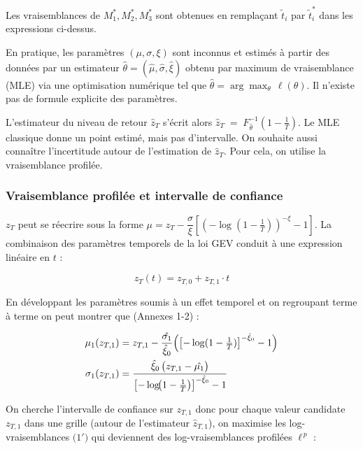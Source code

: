 \documentclass[
  article,
  nofooter,
  noheadings]{jss}
\begin{document}
Les vraisemblances de \(M_1^*, M_2^*, M_3^*\) sont obtenues en
remplaçant \(\tilde{t}_i\) par \(\tilde{t}_i^\ast\) dans les expressions
ci-dessus.

En pratique, les paramètres \((\mu, \sigma, \xi)\) sont inconnus et
estimés à partir des données par un estimateur
\(\hat{\theta} = (\hat{\mu}, \hat{\sigma}, \hat{\xi})\) obtenu par
maximum de vraisemblance (MLE) via une optimisation numérique tel que
\(\hat{\theta} = \arg\max_{\theta} \, \ell(\theta)\). Il n'existe pas de
formule explicite des paramètres.

L'estimateur du niveau de retour \(\hat{z}_T\) s'écrit alors
\(\hat{z}_{T}\;=\;F^{-1}_{\hat{\theta}}\!\left(1-\frac{1}{T}\right)\).
Le MLE classique donne un point estimé, mais pas d'intervalle. On
souhaite aussi connaître l'incertitude autour de l'estimation de
\(\hat{z}_T\). Pour cela, on utilise la vraisemblance profilée.

\subsubsection{Vraisemblance profilée et intervalle de
confiance}\label{vraisemblance-profiluxe9e-et-intervalle-de-confiance}

\(z_T\) peut se réecrire sous la forme
\(\mu = z_T - \dfrac{\sigma}{\xi} \left[ \left( -\log\left(1 - \frac{1}{T} \right) \right)^{-\xi} - 1 \right]\).
La combinaison des paramètres temporels de la loi GEV conduit à une
expression linéaire en \(t\) :

\[
z_T(t) = z_{T,0} + z_{T,1} \cdot t
\]

En développant les paramètres soumis à un effet temporel et on
regroupant terme à terme on peut montrer que (Annexes 1-2) :

\[
\begin{aligned}
\mu_1(z_{T,1}) &= z_{T,1} -\dfrac{\hat{\sigma_1}}{\hat{\xi}_0}\Bigl(\bigl[-\log(1-\tfrac1T)\bigr]^{-\hat{\xi}_0}-1\Bigr)\\
\sigma_1(z_{T,1}) &= \dfrac{\hat{\xi}_0\,\bigl(z_{T,1}-\hat{\mu_1}\bigr)}{\bigl[-\log\!\bigl(1-\tfrac1T\bigr)\bigr]^{-\hat{\xi}_0}-1}\\
\end{aligned}
\]

On cherche l'intervalle de confiance sur \(z_{T,1}\) donc pour chaque
valeur candidate \(z_{T,1}\) dans une grille (autour de l'estimateur
\(\hat{z}_{T,1}\)), on maximise les log-vraisemblances
\textbf{\(\text{(1$'$)}\)} qui deviennent des log-vraisemblances
profilées \(\ell^{\,p}\) :
\end{document}
